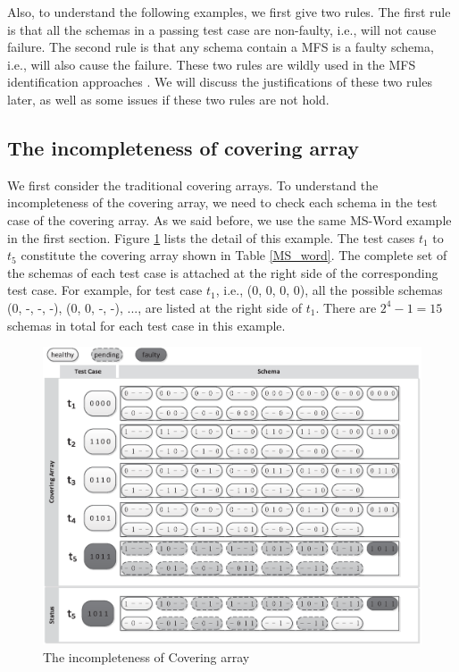 Also, to understand the following examples, we first give two rules. The first rule is that all the schemas in a passing test case are non-faulty, i.e., will not cause failure. The second rule is that any schema contain a MFS is a faulty schema, i.e., will also cause the failure. These two rules are wildly used in the MFS identification approaches \cite{nie2011minimal,zhang2011characterizing,ghandehari2012identifying,niu2013identifying}. We will discuss the justifications of these two rules later, as well as some issues if these two rules are not hold.




\subsection{The incompleteness of covering array}

We first consider the traditional covering arrays. To understand the incompleteness of the covering array, we need to check each schema in the test case of the covering array. As we said before, we use the same MS-Word example in the first section.  Figure \ref{fig_inc_ca} lists the detail of this example. The test cases $t_{1}$ to $t_{5}$ constitute the covering array shown in Table \ref{MS_word}. The complete set of the schemas of each test case is attached at the right side of the corresponding test case.  For example, for test case $t_{1}$, i.e., (0, 0, 0, 0), all the possible schemas (0, -, -, -), (0, 0, -, -), ..., are listed at the right side of $t_{1}$. There are $2^{4}-1 = 15$ schemas in total for each test case in this example.

\begin{figure}[!ht]
 \centering
 \includegraphics[width=5.6in]{ca.eps}
 \caption{The incompleteness of Covering array }
 \label{fig_inc_ca}
\end{figure}

